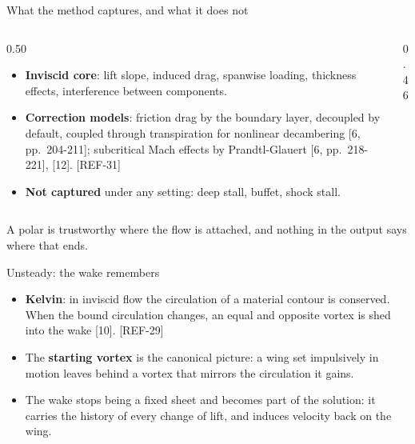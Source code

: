 \begin{frame}{What the method captures, and what it does not}
\begin{columns}[T]
\begin{column}{0.50\textwidth}
\begin{itemize}\small
  \item \textbf{Inviscid core}: lift slope, induced drag, spanwise loading,
        thickness effects, interference between components.
  \item \textbf{Correction models}: friction drag by the boundary layer,
        decoupled by default, coupled through transpiration for nonlinear
        decambering [6, pp.~204-211]; subcritical Mach effects by
        Prandtl-Glauert [6, pp.~218-221], [12]. [REF-31]
  \item \textbf{Not captured} under any setting: deep stall, buffet, shock
        stall.
\end{itemize}
\end{column}
\begin{column}{0.46\textwidth}
\end{column}
\end{columns}
\begin{takeaway}A polar is trustworthy where the flow is attached, and nothing
in the output says where that ends.\end{takeaway}
\end{frame}

\begin{frame}{Unsteady: the wake remembers}
\begin{itemize}\small
  \item \textbf{Kelvin}: in inviscid flow the circulation of a material
        contour is conserved. When the bound circulation changes, an equal and
        opposite vortex is shed into the wake [10]. [REF-29]
  \item The \textbf{starting vortex} is the canonical picture: a wing set
        impulsively in motion leaves behind a vortex that mirrors the
        circulation it gains.
  \item The wake stops being a fixed sheet and becomes part of the solution:
        it carries the history of every change of lift, and induces velocity
        back on the wing.
\end{itemize}
\end{frame}

